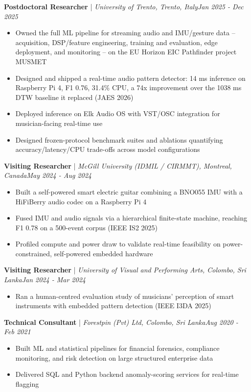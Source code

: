 \documentclass[11pt]{article}
\newenvironment{cvrole}[5]{%
  \par\noindent\textbf{\large #1} | \textit{\small #2, #3}\hfill \textit{\small #4 - #5}\par
  \begin{itemize}[leftmargin=2em, itemsep=-0.3em, topsep=-0.5em]%
}{%
  \end{itemize}\par\noindent\mbox{}\par\vspace{0.1em}%
}
\begin{document}
\begin{cvrole}{Postdoctoral Researcher}{University of Trento}{Trento, Italy}{Jan 2025}{Dec 2025}
    \item Owned the full ML pipeline for streaming audio and IMU/gesture data -- acquisition, DSP/feature engineering, training and evaluation, edge deployment, and monitoring -- on the EU Horizon EIC Pathfinder project MUSMET
    \item Designed and shipped a real-time audio pattern detector: 14 ms inference on Raspberry Pi 4, F1 0.76, 31.4\% CPU, a 74x improvement over the 1038 ms DTW baseline it replaced (JAES 2026)
    \item Deployed inference on Elk Audio OS with VST/OSC integration for musician-facing real-time use
    \item Designed frozen-protocol benchmark suites and ablations quantifying accuracy/latency/CPU trade-offs across model configurations
\end{cvrole}

\begin{cvrole}{Visiting Researcher}{McGill University (IDMIL / CIRMMT)}{Montreal, Canada}{May 2024}{Aug 2024}
    \item Built a self-powered smart electric guitar combining a BNO055 IMU with a HiFiBerry audio codec on a Raspberry Pi 4
    \item Fused IMU and audio signals via a hierarchical finite-state machine, reaching F1 0.78 on a 500-event corpus (IEEE IS2 2025)
    \item Profiled compute and power draw to validate real-time feasibility on power-constrained, self-powered embedded hardware
\end{cvrole}

\begin{cvrole}{Visiting Researcher}{University of Visual and Performing Arts}{Colombo, Sri Lanka}{Jan 2024}{Mar 2024}
    \item Ran a human-centred evaluation study of musicians' perception of smart instruments with embedded pattern detection (IEEE I3DA 2025)
\end{cvrole}

\begin{cvrole}{Technical Consultant}{Forestpin (Pvt) Ltd}{Colombo, Sri Lanka}{Aug 2020}{Feb 2021}
    \item Built ML and statistical pipelines for financial forensics, compliance monitoring, and risk detection on large structured enterprise data
    \item Delivered SQL and Python backend anomaly-scoring services for real-time flagging
\end{cvrole}
\end{document}
